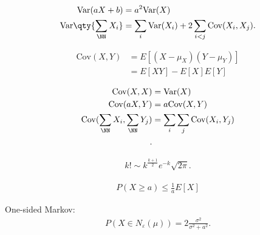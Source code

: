 \begin{proposition}

\begin{align*}  
\mathrm{Var}(aX + b) &= a^2\mathrm{Var}(X) \\
\mathrm{Var}\qty{ \sum_\NN X_i } &= 
\sum_i \mathrm{Var}(X_i) + 2 \sum_{i < j}\mathrm{Cov}(X_i, X_j)
.\end{align*}

\end{proposition}

\begin{definition}[Covariance]

\begin{align*}
\mathrm{Cov}(X,Y) &= E[(X-\mu_X)(Y-\mu_Y)] \\
 &= E[XY] - E[X]E[Y]
\end{align*}

\end{definition}

\begin{proposition}

\begin{align*}  
\mathrm{Cov}(X, X) &= \mathrm{Var}(X) \\
\mathrm{Cov}(aX, Y) &= a\mathrm{Cov}(X,Y) \\
\mathrm{Cov}(\sum_{\NN} X_i, \sum_\NN Y_j) 
&= \sum_i \sum_j\mathrm{Cov}(X_i, Y_j) \\
.\end{align*}

\end{proposition}

\begin{proposition}

\begin{align*}
k! \sim k^\frac{k+1}{2}e^{-k} \sqrt{2\pi}
.\end{align*}

\end{proposition}

\begin{proposition}

\begin{align*}
P(X \geq a) \leq \frac 1 a E[X]
\end{align*}

One-sided Markov:
\begin{align*}
P(X \in N_\varepsilon(\mu)) = 2\frac{\sigma^2}{\sigma^2 + a^2}
.\end{align*}

\end{proposition}

